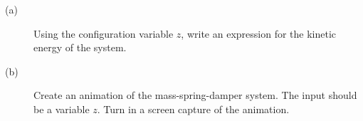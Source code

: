 \begin{description}
    \item[(a)] Using the configuration variable $z$, write an expression for the kinetic energy of the system.
    \item[(b)] Create an animation of the mass-spring-damper system. The input should be a variable $z$.  Turn in a screen capture of the animation.
\end{description}




